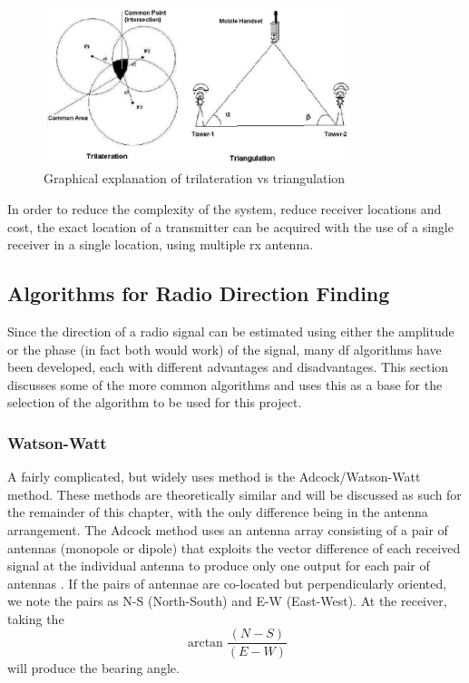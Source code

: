 \documentclass[class=report,11pt,crop=false]{standalone}
\begin{document}
\begin{figure}[h]
    \centering
    \captionsetup{type=figure}
    \includegraphics[width=0.8\textwidth]{../Images/diagrams/tri_vs_tri.png}
    \caption{Graphical explanation of trilateration vs triangulation         \cite{triangulation-vs-trilateration} }
    
    \label{fig:Tri vs Tri }
\end{figure}

In order to reduce the complexity of the system, reduce receiver locations and cost, the exact location of a transmitter can be acquired with the use of a single receiver in a single location, using multiple \gls{rx} antenna. 

\subsection{Algorithms for Radio Direction Finding}
Since the direction of a radio signal can be estimated using either the amplitude or the phase (in fact both would work) of the signal, many \gls{df} algorithms have been developed, each with different advantages and disadvantages. This section discusses some of the more common algorithms and uses this as a base for the selection of the algorithm to be used for this project. 

\subsubsection{Watson-Watt}
A fairly complicated, but widely uses method is the Adcock/Watson-Watt method. These methods are theoretically similar and will be discussed as such for the remainder of this chapter, with the only difference being in the antenna arrangement. The Adcock method uses an antenna array consisting of a pair of antennas (monopole or dipole) that exploits the vector difference of each received signal at the individual antenna to produce only one output for each pair of antennas \cite{ww-df}. If the pairs of antennae are co-located but perpendicularly oriented, we note the pairs as N-S (North-South) and E-W (East-West). At the receiver, taking the
\begin{equation}
    \arctan{\frac{(N-S)}{(E-W)}}
    \label{ww-equation}
\end{equation}
will produce the bearing angle. 
\end{document}
